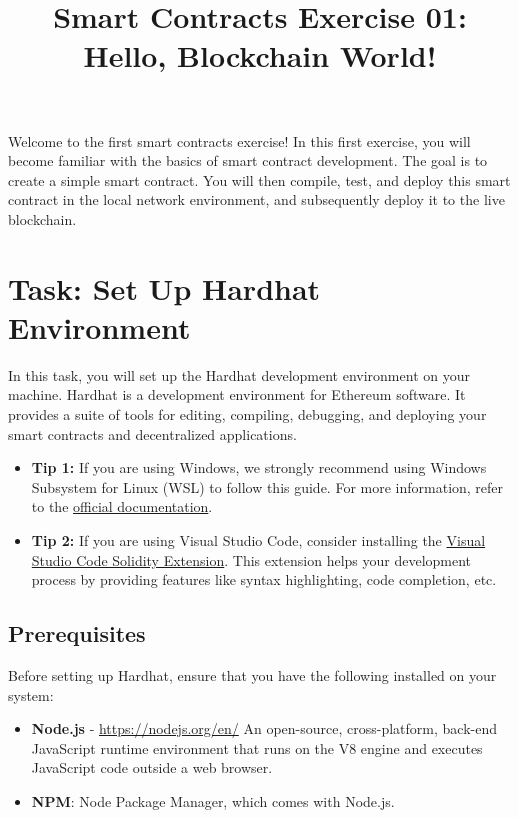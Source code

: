 \documentclass[12pt]{article}
\title{Smart Contracts Exercise 01: \\ Hello, Blockchain World!}
\author{}
\date{}
\begin{document}
\maketitle
Welcome to the first smart contracts exercise! In this first exercise, you will become familiar with the basics of smart contract development. The goal is to create a simple smart contract. You will then compile, test, and deploy this smart contract in the local network environment, and subsequently deploy it to the live blockchain.

\section{Task: Set Up Hardhat Environment}

In this task, you will set up the Hardhat development environment on your machine. Hardhat is a development environment for Ethereum software. It provides a suite of tools for editing, compiling, debugging, and deploying your smart contracts and decentralized applications.

\begin{itemize}
    \item \textbf{Tip 1:} If you are using Windows, we strongly recommend using Windows Subsystem for Linux (WSL) to follow this guide. For more information, refer to the \href{https://learn.microsoft.com/en-us/windows/wsl/about}{official documentation}.
    
    \item \textbf{Tip 2:} If you are using Visual Studio Code, consider installing the \href{https://marketplace.visualstudio.com/items?itemName=JuanBlanco.solidity}{Visual Studio Code Solidity Extension}. This extension helps your development process by providing features like syntax highlighting, code completion, etc.
\end{itemize}


\subsection{Prerequisites}
Before setting up Hardhat, ensure that you have the following installed on your system:

\begin{itemize}
    \item \textbf{Node.js} - \url{https://nodejs.org/en/}
    An open-source, cross-platform, back-end JavaScript runtime environment that runs on the V8 engine and executes JavaScript code outside a web browser. 
    \item \textbf{NPM}: Node Package Manager, which comes with Node.js.
\end{itemize}
\end{document}
